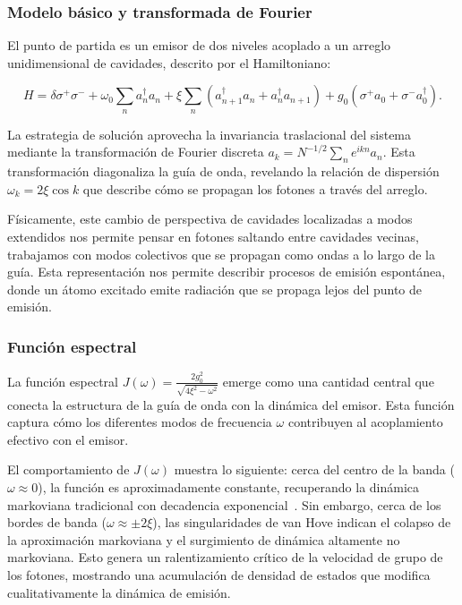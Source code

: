 \documentclass[onecolumn,notitlepage,letterpaper,aps,pra,12pt]{article}
\numberwithin{equation}{section}
\begin{document}
\subsubsection{Modelo básico y transformada de Fourier}

El punto de partida es un emisor de dos niveles acoplado a un arreglo unidimensional de cavidades, descrito por el Hamiltoniano:

\[H = \delta\sigma^{+}\sigma^{-} + \omega_{0}\sum_{n}a^{\dagger}_{n}a_{n} + \xi\sum_{n}\left(a^{\dagger}_{n+1}a_{n} + a^{\dagger}_{n}a_{n+1}\right) + g_{0}\left(\sigma^{+}a_{0} + \sigma^{-}a^{\dagger}_{0}\right).\]

La estrategia de solución aprovecha la invariancia traslacional del sistema mediante la transformación de Fourier discreta $a_{k} = N^{-1/2}\sum_{n}e^{ikn}a_{n}$. Esta transformación  diagonaliza la guía de onda, revelando la relación de dispersión $\omega_{k} = 2\xi\cos k$ que describe cómo se propagan los fotones a través del arreglo.

Físicamente, este cambio de perspectiva de cavidades localizadas a modos extendidos nos permite pensar en fotones saltando entre cavidades vecinas, trabajamos con modos colectivos que se propagan como ondas a lo largo de la guía. Esta representación nos permite describir procesos de emisión espontánea, donde un átomo excitado emite radiación que se propaga lejos del punto de emisión.

\subsubsection{Función espectral}

La función espectral $J(\omega) = \frac{2g_{0}^{2}}{\sqrt{4\xi^{2}-\omega^{2}}}$ emerge como una cantidad central que conecta la estructura de la guía de onda con la dinámica del emisor. Esta función captura cómo los diferentes modos de frecuencia $\omega$ contribuyen al acoplamiento efectivo con el emisor.

El comportamiento de $J(\omega)$ muestra lo siguiente: cerca del centro de la banda ($\omega \approx 0$), la función es aproximadamente constante, recuperando la dinámica markoviana tradicional con decadencia exponencial~\cite{berman2010}. Sin embargo, cerca de los bordes de banda ($\omega \approx \pm 2\xi$), las singularidades de van Hove indican el colapso de la aproximación markoviana y el surgimiento de dinámica altamente no markoviana.
Esto genera un ralentizamiento crítico de la velocidad de grupo de los fotones, mostrando  una acumulación de densidad de estados que modifica cualitativamente la dinámica de emisión.
\end{document}
